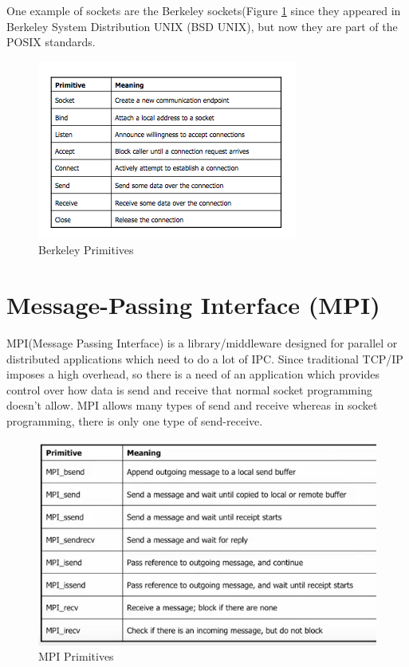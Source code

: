 \documentclass[twoside]{article}
\begin{document}
One example of sockets are the Berkeley sockets(Figure \ref{BSD} since they appeared in Berkeley System Distribution UNIX (BSD UNIX), but now they are part of the POSIX standards. 

\begin{figure}[h]
	\begin{center}
		\includegraphics[scale=0.7]{images/BSD}
		\caption{Berkeley Primitives}
		\label{BSD}
	\end{center}
\end{figure}


\section{Message-Passing Interface (MPI)}

MPI(Message Passing Interface) is a library/middleware designed for parallel or distributed applications which need to do a lot of IPC. Since traditional TCP/IP imposes a high overhead, so there is a need of an application which provides control over how data is send and receive that normal socket programming doesn't allow. MPI allows many types of send and receive whereas in socket programming, there is only one type of send-receive.

\begin{figure}[h]
\begin{center}
\includegraphics[scale=0.5]{images/MPI_Primitives}
\caption{MPI Primitives}
\label{mpi_primitives}
\end{center}
\end{figure}
\end{document}
